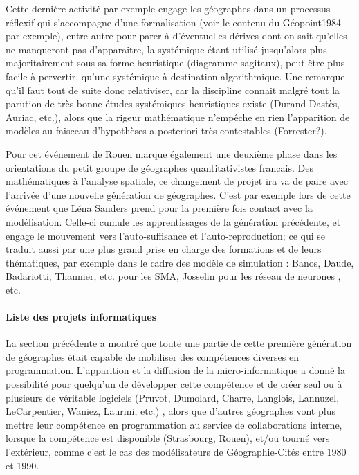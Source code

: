 Cette dernière activité par exemple engage les géographes dans un processus réflexif qui s'accompagne d'une formalisation (voir le contenu du Géopoint1984 par exemple), entre autre pour parer à d'éventuelles dérives dont on sait qu'elles ne manqueront pas d'apparaitre, la systémique étant utilisé jusqu'alors plus majoritairement sous sa forme heuristique (diagramme sagitaux), peut être plus facile à pervertir, qu'une systémique à destination algorithmique. Une remarque qu'il faut tout de suite donc relativiser, car la discipline connait malgré tout la parution de très bonne études systémiques heuristiques existe (Durand-Dastès, Auriac, etc.), alors que la rigeur mathématique n'empêche en rien l'apparition de modèles au faisceau d'hypothèses a posteriori très contestables (Forrester?). \textcite{Orain2006} %

Pour \autocite[320-321]{Cuyala2014} cet événement de Rouen marque également une deuxième phase dans les orientations du petit groupe de géographes quantitativistes francais. Des mathématiques à l'analyse spatiale, ce changement de projet ira va de paire avec l'arrivée d'une nouvelle génération de géographes. C'est par exemple lors de cette événement que Léna Sanders prend pour la première fois contact avec la modélisation. Celle-ci cumule les apprentissages de la génération précédente, et engage le mouvement vers l'auto-suffisance et l'auto-reproduction; ce qui se traduit aussi par une plus grand prise en charge des formations et de leurs thématiques, par exemple dans le cadre des modèle de simulation : Banos, Daude, Badariotti, Thannier, etc. pour les SMA, Josselin pour les réseau de neurones \autocite{Dumolard1994}, etc.

\paragraph{Liste des projets informatiques}

La section précédente a montré que toute une partie de cette première génération de géographes était capable de mobiliser des compétences diverses en programmation. L'apparition et la diffusion de la micro-informatique a donné la possibilité pour quelqu'un de développer cette compétence et de créer seul ou à plusieurs de véritable logiciels (Pruvot, Dumolard, Charre, Langlois, Lannuzel, LeCarpentier, Waniez, Laurini,  etc.) \autocites[191]{Mathieu2014}, alors que d'autres géographes vont plus mettre leur compétence en programmation au service de collaborations interne, lorsque la compétence est disponible (Strasbourg, Rouen), et/ou tourné vers l'extérieur, comme c'est le cas des modélisateurs de Géographie-Cités entre 1980 et 1990.

